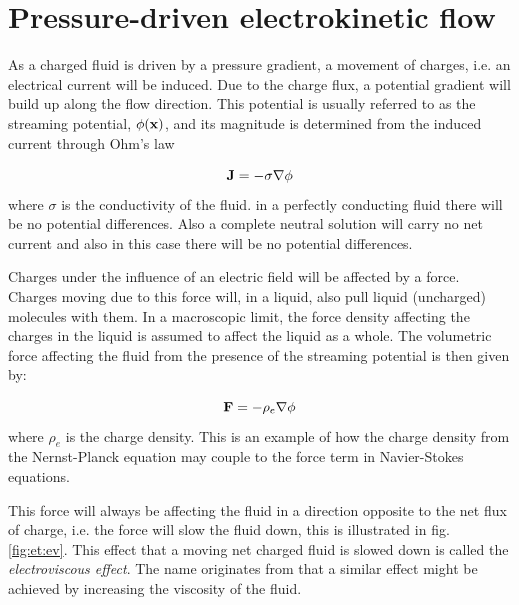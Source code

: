 \section{Pressure-driven electrokinetic flow}\label{sec:et:streaming_pot}
As a charged fluid is driven by a pressure gradient, a movement of
charges, i.e. an electrical current will be induced. Due to the charge
flux, a potential gradient will build up along the flow
direction. This potential is usually referred to as the streaming
potential, $\phi(\mathbf{x})$, and its magnitude is determined from the
induced current through Ohm's law

\begin{equation}
\mathbf{J} = -  \sigma \nabla \phi  
\end{equation}   
where $\sigma$ is the conductivity of the fluid. in a perfectly
conducting fluid there will be no potential differences. Also a
complete neutral solution will carry no net current and also in this
case there will be no potential differences.

Charges under the influence of an electric field will be affected by a
force. Charges moving due to this force will, in a liquid, also pull
liquid (uncharged) molecules with them. In a macroscopic limit, the
force density affecting the charges in the liquid is assumed to affect
the liquid as a whole. The volumetric force affecting the fluid from
the presence of the streaming potential is then given by:

\begin{equation}
\mathbf{F} = - \rho_e \nabla \phi
\end{equation}
where $\rho_e$ is the charge density. This is an example of how the
charge density from the Nernst-Planck equation may couple to the force
term in Navier-Stokes equations. 

This force will always be affecting the fluid in a direction opposite
to the net flux of charge, i.e. the force will slow the fluid down,
this is illustrated in fig. \ref{fig:et:ev}. This effect that a moving
net charged fluid is slowed down is called the \emph{electroviscous
  effect}. The name originates from that a similar effect might be
achieved by increasing the viscosity of the fluid.

